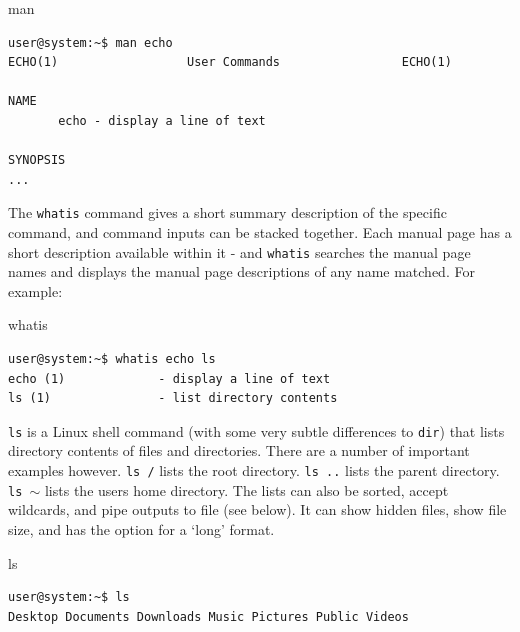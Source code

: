 \documentclass[11pt]{article}
\begin{document}
\begin{listing}[H]
\caption{man}\vspace{-0.1in}
\begin{verbatim}
user@system:~$ man echo
ECHO(1)                  User Commands                 ECHO(1)

NAME
       echo - display a line of text

SYNOPSIS
...
\end{verbatim}
\end{listing}

The \texttt{whatis} command gives a short summary description of the specific command, and command inputs can be stacked together. Each manual page has a short description available within it - and \texttt{whatis} searches the manual page names and displays the manual page descriptions of any name matched. For example: \\

\begin{listing}[H]
\caption{whatis}\vspace{-0.1in}
\begin{verbatim}
user@system:~$ whatis echo ls
echo (1)             - display a line of text
ls (1)               - list directory contents
\end{verbatim}
\end{listing}

\texttt{ls} is a Linux shell command (with some very subtle differences to \texttt{dir}) that lists directory contents of files and directories. There are a number of important examples however. \texttt{ls /} lists the root directory. \texttt{ls ..} lists the parent directory. \texttt{ls $\sim$} lists the users home directory. The lists can also be sorted, accept wildcards, and pipe outputs to file (see below). It can show hidden files, show file size, and has the option for a `long' format.\\

\begin{listing}[H]
\caption{ls}\vspace{-0.1in}
\begin{verbatim}
user@system:~$ ls
Desktop Documents Downloads Music Pictures Public Videos
\end{verbatim}
\end{listing}
\end{document}
